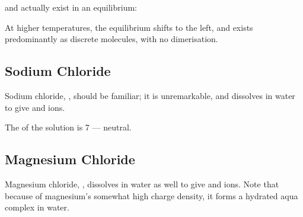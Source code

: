 

				 and  actually exist in an equilibrium:


				At higher temperatures, the equilibrium shifts to the left, and  exists predominantly as discrete molecules, with
				no dimerisation.






		\pagebreak
		\subsection{Sodium Chloride}

			Sodium chloride, , should be familiar; it is unremarkable, and dissolves in water to give  and
			\ch{\Cl- \stAq} ions.


			The \pH{} of the solution is \num{7} --- neutral.




		\subsection{Magnesium Chloride}

			Magnesium chloride, , dissolves in water as well to give  and \ch{\Cl- \stAq} ions. Note that because
			of magnesium's somewhat high charge density, it forms a hydrated aqua complex in water.

